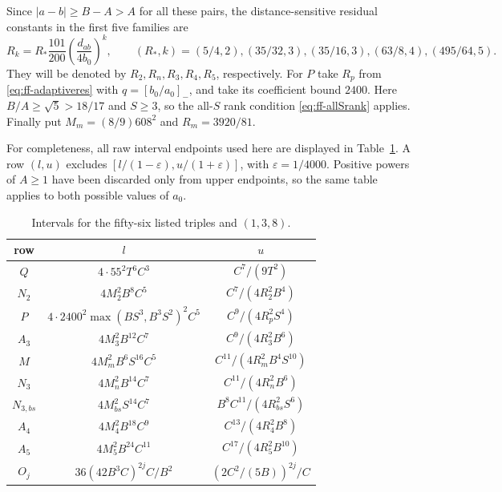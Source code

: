 \documentclass[12pt]{article}
\numberwithin{equation}{section}
\begin{document}
Since $|a-b|\ge B-A>A$ for all these pairs, the distance-sensitive
residual constants in the first five families are
\begin{equation}\label{eq:fixed56-residual}
 R_k=R_*\frac{101}{200}\left(\frac{d_{ab}}{4b_0}\right)^k,
 \qquad (R_*,k)=
 (5/4,2),(35/32,3),(35/16,3),(63/8,4),(495/64,5).
\end{equation}
They will be denoted by $R_2,R_n,R_3,R_4,R_5$, respectively.
For $P$ take $R_p$ from \eqref{eq:ff-adaptiveres} with
$q=[b_0/a_0]_-$, and take its coefficient bound $2400$.
Here $B/A\ge\sqrt5>18/17$ and $S\ge3$, so the all-$S$ rank
condition \eqref{eq:ff-allSrank} applies.
Finally put $M_m=(8/9)608^2$ and $R_m=3920/81$.

For completeness, all raw interval endpoints used here are displayed
in Table~\ref{tab:fixed56-windows}. A row $(l,u)$ excludes
$[l/(1-\varepsilon),u/(1+\varepsilon)]$, with
$\varepsilon=1/4000$. Positive powers of $A\ge1$ have been discarded
only from upper endpoints, so the same table applies to both possible
values of $a_0$.
\begin{table}[ht]\centering\small
\begin{tabular}{c|c|c}
row&$l$&$u$\\\hline
$Q$&$4\cdot55^2T^6C^3$&$C^7/(9T^2)$\\
$N_2$&$4M_2^2B^8C^5$&$C^7/(4R_2^2B^4)$\\
$P$&$4\cdot2400^2\max(BS^3,B^3S^2)^2C^5$&$C^9/(4R_p^2S^4)$\\
$A_3$&$4M_3^2B^{12}C^7$&$C^9/(4R_3^2B^6)$\\
$M$&$4M_m^2B^6S^{16}C^5$&$C^{11}/(4R_m^2B^4S^{10})$\\
$N_3$&$4M_n^2B^{14}C^7$&$C^{11}/(4R_n^2B^6)$\\
$N_{3,bs}$&$4M_{bs}^2S^{14}C^7$&$B^8C^{11}/(4R_{bs}^2S^6)$\\
$A_4$&$4M_4^2B^{18}C^9$&$C^{13}/(4R_4^2B^8)$\\
$A_5$&$4M_5^2B^{24}C^{11}$&$C^{17}/(4R_5^2B^{10})$\\
$O_j$&$36(42B^3C)^{2j}C/B^2$&$(2C^2/(5B))^{2j}/C$
\end{tabular}
\caption{Intervals for the fifty-six listed triples and $(1,3,8)$.}
\label{tab:fixed56-windows}
\end{table}
\end{document}

